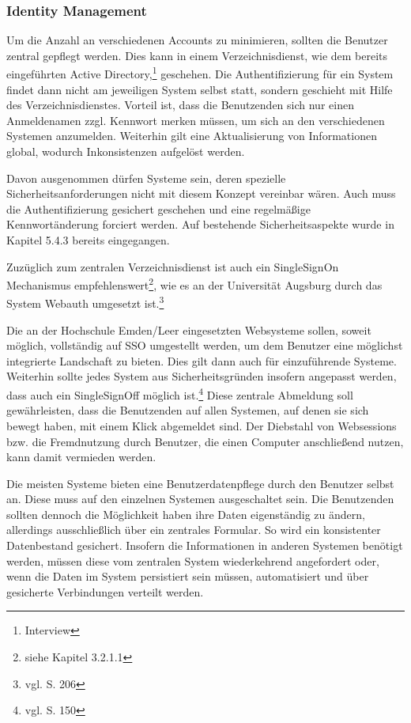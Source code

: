 \subsubsection{Identity Management}
Um die Anzahl an verschiedenen Accounts zu minimieren, sollten die Benutzer zentral gepflegt werden. Dies kann in einem Verzeichnisdienst, wie dem bereits eingeführten Active Directory,\footnote{Interview} geschehen. Die Authentifizierung für ein System findet dann nicht am jeweiligen System selbst statt, sondern geschieht mit Hilfe des Verzeichnisdienstes. Vorteil ist, dass die Benutzenden sich nur einen Anmeldenamen zzgl. Kennwort merken müssen, um sich an den verschiedenen Systemen anzumelden. Weiterhin gilt eine Aktualisierung von Informationen global, wodurch Inkonsistenzen aufgelöst werden.

Davon ausgenommen dürfen Systeme sein, deren spezielle Sicherheitsanforderungen nicht mit diesem Konzept vereinbar wären. Auch muss die Authentifizierung gesichert geschehen und eine regelmäßige Kennwortänderung forciert werden. Auf bestehende Sicherheitsaspekte wurde in Kapitel 5.4.3 bereits eingegangen.

Zuzüglich zum zentralen Verzeichnisdienst ist auch ein SingleSignOn Mechanismus empfehlenswert\footnote{siehe Kapitel 3.2.1.1}, wie es an der Universität Augsburg durch das System Webauth umgesetzt ist.\footnote{vgl. \cite{digicampus_2009} S. 206}

Die an der Hochschule Emden/Leer eingesetzten Websysteme sollen, soweit möglich, vollständig auf SSO umgestellt werden, um dem Benutzer eine möglichst integrierte Landschaft zu bieten. Dies gilt dann auch für einzuführende Systeme. Weiterhin sollte jedes System aus Sicherheitsgründen insofern angepasst werden, dass auch ein SingleSignOff möglich ist.\footnote{vgl. \cite{kloetgen_2012} S. 150} Diese zentrale Abmeldung soll gewährleisten, dass die Benutzenden auf allen Systemen, auf denen sie sich bewegt haben, mit einem Klick abgemeldet sind. Der Diebstahl von Websessions bzw. die Fremdnutzung durch Benutzer, die einen Computer anschließend nutzen, kann damit vermieden werden.

Die meisten Systeme bieten eine Benutzerdatenpflege durch den Benutzer selbst an. Diese muss auf den einzelnen Systemen ausgeschaltet sein. Die Benutzenden sollten dennoch die Möglichkeit haben ihre Daten eigenständig zu ändern, allerdings ausschließlich über ein zentrales Formular. So wird ein konsistenter Datenbestand gesichert. Insofern die Informationen in anderen Systemen benötigt werden, müssen diese vom zentralen System wiederkehrend angefordert oder, wenn die Daten im System persistiert sein müssen, automatisiert und über gesicherte Verbindungen verteilt werden.

